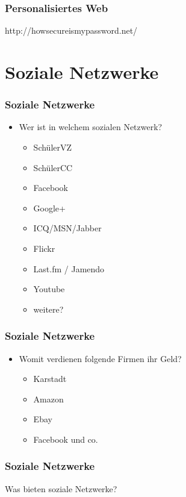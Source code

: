 \documentclass[12pt]{beamer}
\begin{document}
\begin{frame}
  \frametitle{Personalisiertes Web}
  \begin{center} \Large
     http://howsecureismypassword.net/
  \end{center}
\end{frame}

\section{Soziale Netzwerke}

\begin{frame}
  \frametitle{Soziale Netzwerke}

  \begin{itemize}
    \item Wer ist in welchem sozialen Netzwerk?
      \begin{itemize}
        \item SchülerVZ
        \item SchülerCC
        \item Facebook
        \item Google+
        \item ICQ/MSN/Jabber
        \item Flickr
        \item Last.fm / Jamendo
        \item Youtube
        \item weitere?
      \end{itemize}
  \end{itemize}
\end{frame}

\begin{frame}
  \frametitle{Soziale Netzwerke}

  \begin{itemize}
    \item Womit verdienen folgende Firmen ihr Geld?
      \begin{itemize}
        \item<1-> Karstadt
        \item<2-> Amazon
        \item<3-> Ebay
        \item<4-> Facebook und co.
      \end{itemize}
  \end{itemize}
\end{frame}

\begin{frame}
  \frametitle{Soziale Netzwerke}

  \begin{center} \Large
     Was bieten soziale Netzwerke?
  \end{center}
\end{frame}
\end{document}
